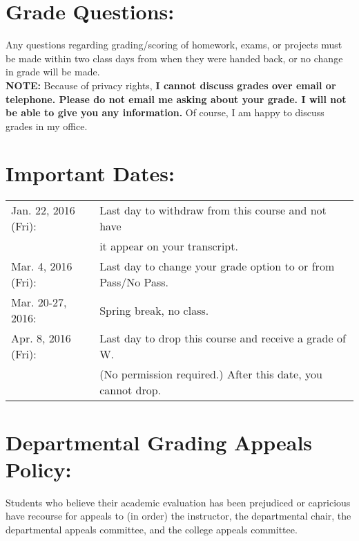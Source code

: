 \documentclass[margin]{res}
\theoremstyle{plain}
\theoremstyle{definition}
\theoremstyle{remark}
\begin{document}
\begin{resume}
\section{Grade Questions:} 
Any questions regarding grading/scoring of homework, exams, or projects must be made within two class days from when they were handed back, or no change in grade will be made.  
\\\textbf{NOTE:} Because of privacy rights, \textbf{I cannot discuss grades over email or telephone. Please do not email me asking about your grade.  I will not be able to give you any information.}  Of course, I am happy to discuss grades in my office.

\section{Important Dates:}
\begin{tabular}{ll}

Jan. 22, 2016 (Fri): & Last day to withdraw from this course and not have\\& it appear on your transcript.\\

Mar. 4, 2016 (Fri): & Last day to change your grade option to or from Pass/No
    Pass.\\
    
Mar. 20-27, 2016:   & Spring break, no class.\\
Apr. 8, 2016 (Fri): &  Last day to drop this course and receive a grade of W. \\&
     (No permission required.) After this date, you cannot drop.
  \end{tabular}

\section{Departmental Grading Appeals Policy:} Students who believe their academic evaluation has been prejudiced or capricious have recourse for appeals to (in order) the instructor, the departmental chair, the departmental appeals committee, and the college appeals committee.  


\end{resume}
\end{document}
